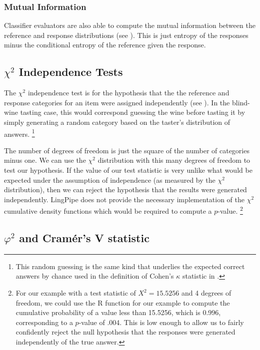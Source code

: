\subsubsection{Mutual Information}

Classifier evaluators are also able to compute the mutual information
between the reference and response distributions (see
).  This is just entropy of the
responses minus the conditional entropy of the reference given the
response.  


\subsection{$\chi^2$ Independence Tests}

The $\chi^2$ independence test is for the hypothesis that the the
reference and response categories for an item were assigned
independently (see ).  In the
blind-wine tasting case, this would correspond guessing the wine
before tasting it by simply generating a random category based on the
taster's distribution of answers.%
%
\footnote{This random guessing is the same kind that underlies the
expected correct answers by chance used in the definition of
Cohen's $\kappa$ statistic in .}
%

The number of degrees of freedom is just the square of the number of
categories minus one.  We can use the $\chi^2$ distribution with this
many degrees of freedom to test our hypothesis.  If the value of our
test statistic is very unlike what would be expected under the
assumption of independence (as measured by the $\chi^2$ distribution),
then we can reject the hypothesis that the results were generated
independently.  LingPipe does not provide the necessary implementation
of the $\chi^2$ cumulative density functions which would be required
to compute a $p$-value.%
%
\footnote{For our example with a test statistic of $X^2 = 15.5256$ and
  4 degrees of freedom, we could use the R function
   for our example to compute the
  cumulative probability of a value less than 15.5256, which is 0.996,
  corresponding to a $p$-value of .004.  This is low enough to allow
  us to fairly confidently reject the null hypothesis that the
  responses were generated independently of the true answer.}


\subsection{$\varphi^2$ and Cram\'er's V statistic}

